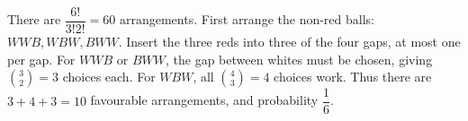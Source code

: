 There are $\dfrac{6!}{3!2!}=60$ arrangements. First arrange the non-red balls: $WWB,WBW,BWW$. Insert the three reds into three of the four gaps, at most one per gap. For $WWB$ or $BWW$, the gap between whites must be chosen, giving $\binom32=3$ choices each. For $WBW$, all $\binom43=4$ choices work. Thus there are $3+4+3=10$ favourable arrangements, and probability $\boxed{\dfrac{1}{6}}$.
